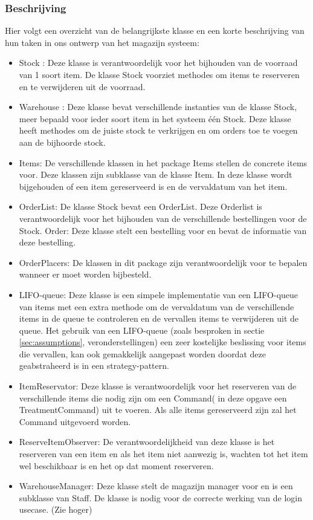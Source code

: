\documentclass[a4paper]{article}
\begin{document}
\subsubsection{Beschrijving}
Hier volgt een overzicht van de belangrijkste klasse en een korte beschrijving van hun taken in ons ontwerp van het magazijn systeem:
\begin{itemize}
\item Stock :  Deze klasse is verantwoordelijk voor het bijhouden van de voorraad van 1 soort item. De klasse Stock voorziet methodes om items te reserveren en te verwijderen uit de voorraad.
\item Warehouse : Deze klasse bevat verschillende instanties van de klasse Stock, meer bepaald voor ieder soort item in het systeem één Stock. Deze klasse heeft methodes om de juiste stock te verkrijgen en om orders toe te voegen aan de bijhoorde stock.
\item Items: De verschillende klassen in het package Items stellen de concrete items voor. Deze klassen zijn subklasse van de klasse Item. In deze klasse wordt bijgehouden of een item gereserveerd is en de vervaldatum van het item.
\item OrderList: De klasse Stock bevat een OrderList. Deze Orderlist is verantwoordelijk voor het bijhouden van de verschillende bestellingen voor de Stock.
Order: Deze klasse stelt een bestelling voor en bevat de informatie van deze bestelling.
\item OrderPlacers: De klassen in dit package zijn verantwoordelijk voor te bepalen wanneer er moet worden bijbesteld.
\item LIFO-queue: Deze klasse is een simpele implementatie van een LIFO-queue van items met een extra methode om de vervaldatum van de verschillende items in de queue te controleren en de vervallen items te verwijderen uit de queue. Het gebruik van een LIFO-queue (zoals besproken in sectie \ref{sec:assumptions}, veronderstellingen) een zeer kostelijke beslissing voor items die vervallen, kan ook gemakkelijk aangepast worden doordat deze geabstraheerd is in een strategy-pattern. 
\item ItemReservator: Deze klasse  is verantwoordelijk voor het reserveren van de verschillende items die nodig zijn om een Command( in deze opgave een TreatmentCommand) uit te voeren. Als alle items gereserveerd zijn zal het Command uitgevoerd worden.
\item ReserveItemObserver: De verantwoordelijkheid van deze klasse is het reserveren van een item en als het item niet aanwezig is, wachten tot het item wel beschikbaar is en het op dat moment reserveren.
\item WarehouseManager: Deze klasse stelt de magazijn manager voor en is een subklasse van Staff. De klasse is nodig voor de correcte werking van de login usecase. (Zie hoger)
\end{itemize}
\end{document}
